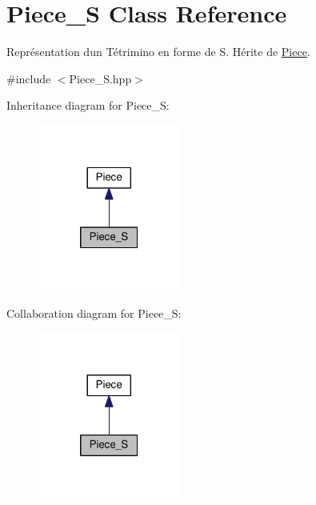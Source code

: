 \hypertarget{classPiece__S}{}\section{Piece\+\_\+S Class Reference}
\label{classPiece__S}


Représentation d\textquotesingle{}un Tétrimino en forme de S. Hérite de \hyperlink{classPiece}{Piece}.  




{\ttfamily \#include $<$Piece\+\_\+\+S.\+hpp$>$}



Inheritance diagram for Piece\+\_\+S\+:
\nopagebreak
\begin{figure}[H]
\begin{center}
\leavevmode
\includegraphics[width=133pt]{classPiece__S__inherit__graph}
\end{center}
\end{figure}


Collaboration diagram for Piece\+\_\+S\+:
\nopagebreak
\begin{figure}[H]
\begin{center}
\leavevmode
\includegraphics[width=133pt]{classPiece__S__coll__graph}
\end{center}
\end{figure}
